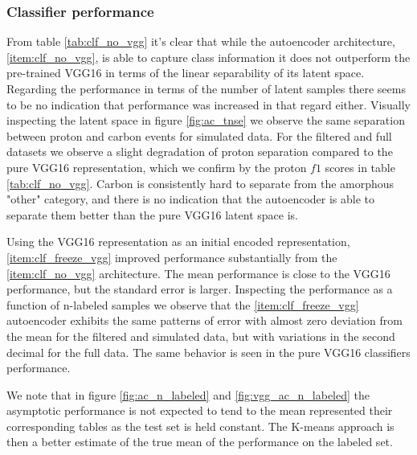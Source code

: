 \subsubsection{Classifier performance}

From table \ref{tab:clf_no_vgg} it's clear that while the autoencoder architecture, \ref{item:clf_no_vgg}, is able to capture class information it does not outperform the pre-trained VGG16 in terms of the linear separability of its latent space. Regarding the performance in terms of the number of latent samples there seems to be no indication that performance was increased in that regard either. Visually inspecting the latent space in figure \ref{fig:ac_tnse} we observe the same separation between proton and carbon events for simulated data. For the filtered and full datasets we observe a slight degradation of proton separation compared to the pure VGG16 representation, which we confirm by the proton $f1$ scores in table \ref{tab:clf_no_vgg}. Carbon is consistently hard to separate from the amorphous "other" category, and there is no indication that the autoencoder is able to separate them better than the pure VGG16 latent space is. 

Using the VGG16 representation as an initial encoded representation, \ref{item:clf_freeze_vgg} improved performance substantially from the \ref{item:clf_no_vgg} architecture. The mean performance is  close to the VGG16 performance, but the standard error is larger.  Inspecting the performance as a function of  n-labeled samples we observe that the \ref{item:clf_freeze_vgg} autoencoder exhibits the same  patterns of error with almost zero deviation from the mean for the filtered and simulated data, but with variations in the second decimal for the full data. The same behavior is seen in the pure VGG16 classifiers performance. 

We note that in figure \ref{fig:ac_n_labeled} and \ref{fig:vgg_ac_n_labeled} the asymptotic performance is not expected to tend to the mean represented their corresponding tables as the test set is held constant. The K-means approach is  then a better estimate of the true mean of the performance on the labeled set.


